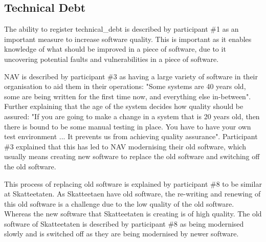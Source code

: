 \subsection{Technical Debt} \label{sec:technical_debt}
The ability to register \gls{technical_debt} is described by participant \#1 as an important measure to increase software quality. This is important as it enables knowledge of what should be improved in a piece of software, due to it uncovering potential faults and vulnerabilities in a piece of software.


NAV is described by participant \#3 as having a large variety of software in their organisation to aid them in their operations: "Some systems are 40 years old, some are being written for the first time now, and everything else in-between". Further explaining that the age of the system decides how quality should be assured: "If you are going to make a change in a system that is 20 years old, then there is bound to be some manual testing in place. You have to have your own test environment ... It prevents us from achieving quality assurance". Participant \#3 explained that this has led to NAV modernising their old software, which usually means creating new software to replace the old software and switching off the old software.


This process of replacing old software is explained by participant \#8 to be similar at Skatteetaten. As Skatteetaen have old software, the re-writing and renewing of this old software is a challenge due to the low quality of the old software. Whereas the new software that Skatteetaten is creating is of high quality. The old software of Skatteetaten is described by participant \#8 as being modernised slowly and is switched off as they are being modernised by newer software.

